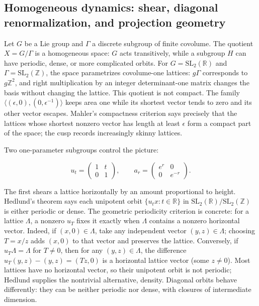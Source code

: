 \subsection{Homogeneous dynamics: shear, diagonal renormalization, and projection geometry}\label{04-visual-computing-ii-ch033-homogeneous-dynamics-shear-diagonal-renormalization-and-projection-geometry-1}

\hypertarget{04-visual-computing-ii-ch033-homogeneous-dynamics-shear-diagonal-renormalization-and-projection-geometry-1}{}

Let \(G\) be a Lie group and \(\Gamma\) a discrete subgroup of finite covolume. The quotient \(X=G/\Gamma\) is a homogeneous space: \(G\) acts transitively, while a subgroup \(H\) can have periodic, dense, or more complicated orbits. For \(G=\mathrm{SL}_2(\mathbb R)\) and \(\Gamma=\mathrm{SL}_2(\mathbb Z)\), the space parametrizes covolume-one lattices: \(g\Gamma\) corresponds to \(g\mathbb Z^2\), and right multiplication by an integer determinant-one matrix changes the basis without changing the lattice. This quotient is not compact. The family \(\langle(\epsilon,0),(0,\epsilon^{-1})\rangle\) keeps area one while its shortest vector tends to zero and its other vector escapes. Mahler's compactness criterion says precisely that the lattices whose shortest nonzero vector has length at least \(\epsilon\) form a compact part of the space; the cusp records increasingly skinny lattices.

Two one-parameter subgroups control the picture:

\[ u_t=\begin{pmatrix}1&t\\0&1\end{pmatrix},\qquad a_r=\begin{pmatrix}e^r&0\\0&e^{-r}\end{pmatrix}. \]

The first shears a lattice horizontally by an amount proportional to height. Hedlund's theorem says each unipotent orbit \(\{u_t x:t\in\mathbb R\}\) in \(\mathrm{SL}_2(\mathbb R)/\mathrm{SL}_2(\mathbb Z)\) is either periodic or dense. The geometric periodicity criterion is concrete: for a lattice \(\Lambda\), a nonzero \(u_T\) fixes it exactly when \(\Lambda\) contains a nonzero horizontal vector. Indeed, if \((x,0)\in\Lambda\), take any independent vector \((y,z)\in\Lambda\); choosing \(T=x/z\) adds \((x,0)\) to that vector and preserves the lattice. Conversely, if \(u_T\Lambda=\Lambda\) for \(T\neq0\), then for any \((y,z)\in\Lambda\), the difference \(u_T(y,z)-(y,z)=(Tz,0)\) is a horizontal lattice vector (some \(z\neq0\)). Most lattices have no horizontal vector, so their unipotent orbit is not periodic; Hedlund supplies the nontrivial alternative, density. Diagonal orbits behave differently: they can be neither periodic nor dense, with closures of intermediate dimension.

